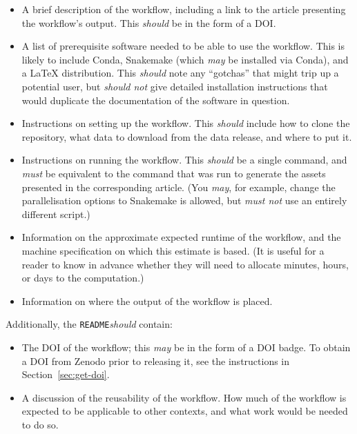 \documentclass{article}
\newcommand\rfcword[1]{\emph{#1}\xspace}
\newcommand\must{\rfcword{must}}
\newcommand\mustnot{\rfcword{must not}}
\newcommand\should{\rfcword{should}}
\newcommand\shouldnot{\rfcword{should not}}
\newcommand\may{\rfcword{may}}
\newcommand\filename[1]{\texttt{#1}\xspace}
\newcommand\readme{\filename{README}}
\begin{document}
\begin{itemize}
  \item
        A brief description of the workflow,
        including a link to the article presenting the workflow's output.
        This \should be in the form of a DOI\@.
  \item
        A list of prerequisite software needed to be able to use the workflow.
        This is likely to include
        Conda,
        Snakemake
        (which \may be installed via Conda),
        and a LaTeX distribution.
        This \should note any ``gotchas'' that might trip up a potential user,
        but \shouldnot give detailed installation instructions
        that would duplicate the documentation of the software in question.
  \item
        Instructions on setting up the workflow.
        This \should include how to clone the repository,
        what data to download from the data release,
        and where to put it.
  \item
        Instructions on running the workflow.
        This \should be a single command,
        and \must be equivalent to the command that was run
        to generate the assets presented in the corresponding article.
        (You \may,
        for example,
        change the parallelisation options to Snakemake is allowed,
        but \mustnot use an entirely different script.)
  \item
        Information on the approximate expected runtime of the workflow,
        and the machine specification on which this estimate is based.
        (It is useful for a reader to know in advance
        whether they will need to allocate
        minutes,
        hours,
        or days
        to the computation.)
  \item
        Information on where the output of the workflow is placed.
\end{itemize}

Additionally,
the \readme \should contain:

\begin{itemize}
  \item
        The DOI of the workflow;
        this \may be in the form of a DOI badge.
        To obtain a DOI from Zenodo prior to releasing it,
        see the instructions in Section~\ref{sec:get-doi}.
  \item
        A discussion of the reusability of the workflow.
        How much of the workflow is expected to be applicable to other contexts,
        and what work would be needed to do so.
\end{itemize}
\end{document}
